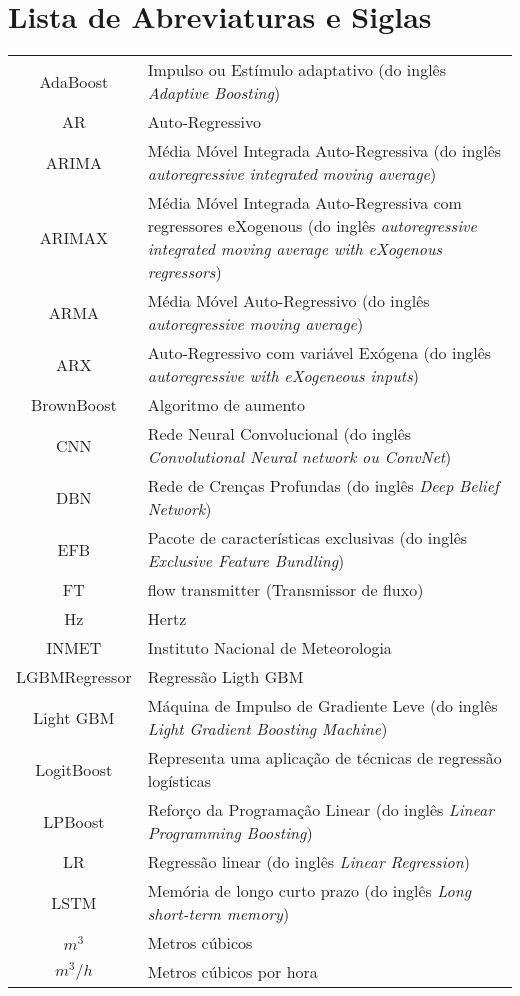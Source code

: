 \section*{Lista de Abreviaturas e Siglas}

\begin{tabular}{cp{}}
	AdaBoost & Impulso ou Estímulo adaptativo (do inglês \textit{Adaptive Boosting}) \\
	AR & Auto-Regressivo\\
	ARIMA & Média Móvel Integrada Auto-Regressiva (do inglês \textit{autoregressive integrated moving average}) \\
	ARIMAX & Média Móvel Integrada Auto-Regressiva com regressores eXogenous (do inglês \textit{autoregressive integrated moving average with eXogenous regressors})\\
	ARMA & Média Móvel Auto-Regressivo (do inglês \textit{autoregressive moving average}) \\
	ARX & Auto-Regressivo com variável Exógena (do inglês \textit{autoregressive with eXogeneous inputs})\\ 
	BrownBoost & Algoritmo de aumento\\
	CNN & Rede Neural Convolucional (do inglês \textit{Convolutional Neural network ou ConvNet})\\
	DBN & Rede de Crenças Profundas (do inglês \textit{Deep Belief Network}) \\
	EFB & Pacote de características exclusivas (do inglês \textit{Exclusive Feature Bundling})\\
	FT & flow transmitter (Transmissor de fluxo)\\
	Hz & Hertz\\
	INMET & Instituto Nacional de Meteorologia\\
	LGBMRegressor & Regressão Ligth GBM\\
	Light GBM & Máquina de Impulso de Gradiente Leve (do inglês \textit{Light Gradient Boosting Machine}) \\
	LogitBoost & Representa uma aplicação de técnicas de regressão logísticas\\
	LPBoost & Reforço da Programação Linear (do inglês \textit{Linear Programming Boosting}) \\
	LR & Regressão linear (do inglês \textit{Linear Regression})\\
	LSTM & Memória de longo curto prazo (do inglês \textit{Long short-term memory})\\
	$m^3$  & Metros cúbicos\\
	$m^3/h$ & Metros cúbicos por hora	
\end{tabular}


